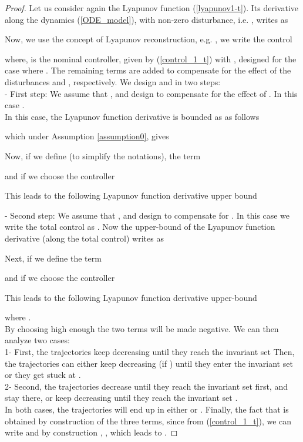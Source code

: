\documentclass[letterpaper, 11 pt, conference]{ieeeconf}
\begin{document}
\begin{proof}
Let us consider again the Lyapunov function (\ref{lyapunov1-t}).
Its derivative along the dynamics (\ref{ODE_model}), with non-zero
disturbance, i.e. , writes as

Now, we use the concept of Lyapunov reconstruction, e.g.
\cite{BL09-4}, we write the control

where,  is the nominal controller, given by
(\ref{control_1_t}) with , designed for the
case where . The remaining terms
 are added to compensate for the effect of the
disturbances  and , respectively. We design 
and  in two steps:\\
- First step: We assume that , and design  to compensate for the effect of
. In this case .\\In this case, the
Lyapunov function derivative is bounded as as follows

 which under Assumption \ref{assumption0}, gives

Now, if we define (to simplify the notations), the term

and if we choose the controller

This leads to the following Lyapunov function derivative upper
bound

- Second step: We assume that ,
and design  to compensate for . In this case we write
the total control as . Now the
upper-bound of the Lyapunov function derivative (along the total
control) writes as

Next, if we define the term

and if we choose the controller

This leads to the following Lyapunov function derivative
upper-bound

where
.
\\
By choosing  high enough the two terms
 will be made negative. We can then analyze two
cases:\\
1- First, the trajectories keep decreasing until they reach the
invariant set
 Then, the trajectories can either keep decreasing (if
) until they enter the invariant set
or they get stuck at .\\
2- Second, the trajectories decrease until they reach the
invariant set  first, and stay there, or keep decreasing
until they reach the invariant set .\\In both cases, the
trajectories will end up in either  or . Finally,
the fact that  is obtained by construction of the
three terms, since from (\ref{control_1_t}), we can write
 and by construction , , which leads to .
\end{proof}
\end{document}
